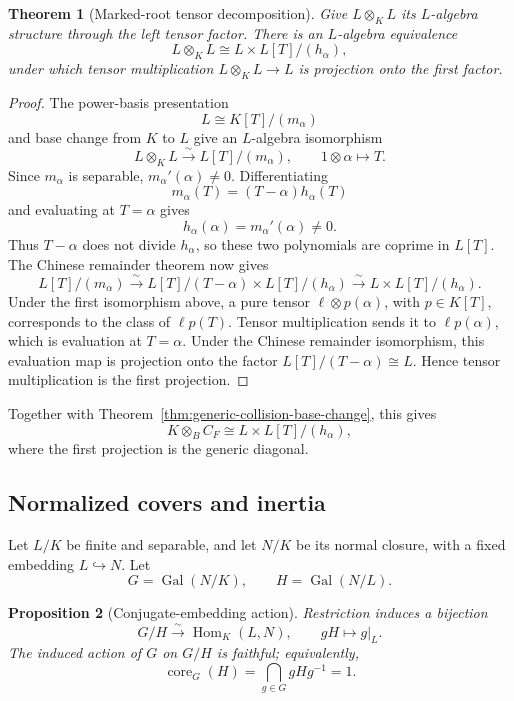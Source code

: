 \documentclass[11pt]{article}
\newtheorem{theorem}{Theorem}[section]
\newtheorem{proposition}[theorem]{Proposition}
\theoremstyle{remark}
\theoremstyle{definition}
\DeclareMathOperator{\Gal}{Gal}
\DeclareMathOperator{\Hom}{Hom}
\DeclareMathOperator{\core}{core}
\begin{document}
\begin{theorem}[Marked-root tensor decomposition]
\label{thm:marked-root-tensor-decomposition}
Give \(L\otimes_KL\) its \(L\)-algebra structure through the left tensor
factor.  There is an \(L\)-algebra equivalence
\[
  L\otimes_KL
  \cong
  L\times L[T]/(h_\alpha),
\]
under which tensor multiplication \(L\otimes_KL\to L\) is projection
onto the first factor.
\end{theorem}

\begin{proof}
The power-basis presentation
\[
  L\cong K[T]/(m_\alpha)
\]
and base change from \(K\) to \(L\) give an \(L\)-algebra isomorphism
\[
  L\otimes_KL
  \xrightarrow{\sim}
  L[T]/(m_\alpha),
  \qquad
  1\otimes\alpha\longmapsto T.
\]
Since \(m_\alpha\) is separable,
\(m_\alpha'(\alpha)\neq0\).  Differentiating
\[
  m_\alpha(T)=(T-\alpha)h_\alpha(T)
\]
and evaluating at \(T=\alpha\) gives
\[
  h_\alpha(\alpha)=m_\alpha'(\alpha)\neq0.
\]
Thus \(T-\alpha\) does not divide \(h_\alpha\), so these two polynomials
are coprime in \(L[T]\).  The Chinese remainder theorem now gives
\[
  L[T]/(m_\alpha)
  \xrightarrow{\sim}
  L[T]/(T-\alpha)\times L[T]/(h_\alpha)
  \xrightarrow{\sim}
  L\times L[T]/(h_\alpha).
\]
Under the first isomorphism above, a pure tensor
\(\ell\otimes p(\alpha)\), with \(p\in K[T]\), corresponds to the class
of \(\ell p(T)\).  Tensor multiplication sends it to
\(\ell p(\alpha)\), which is evaluation at \(T=\alpha\).  Under the
Chinese remainder isomorphism, this evaluation map is projection onto
the factor \(L[T]/(T-\alpha)\cong L\).  Hence tensor multiplication is
the first projection.
\end{proof}

Together with Theorem~\ref{thm:generic-collision-base-change}, this gives
\[
  K\otimes_BC_F
  \cong
  L\times L[T]/(h_\alpha),
\]
where the first projection is the generic diagonal.

\subsection{Normalized covers and inertia}
\label{sec:normalized-covers-inertia}

Let \(L/K\) be finite and separable, and let \(N/K\) be its normal
closure, with a fixed embedding \(L\hookrightarrow N\).  Let
\[
  G=\Gal(N/K),
  \qquad
  H=\Gal(N/L).
\]

\begin{proposition}[Conjugate-embedding action]
\label{prop:conjugate-embedding-action}
Restriction induces a bijection
\[
  G/H\xrightarrow{\sim}\Hom_K(L,N),
  \qquad
  gH\longmapsto g|_L.
\]
The induced action of \(G\) on \(G/H\) is faithful; equivalently,
\[
  \core_G(H)=\bigcap_{g\in G}gHg^{-1}=1.
\]
\end{proposition}
\end{document}
